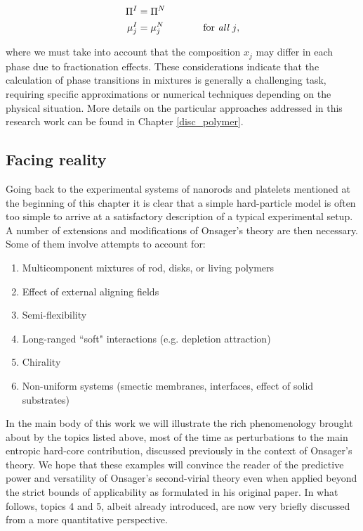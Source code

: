 \begin{align}
\Pi^{I}&=\Pi^{N} \nonumber \\
\mu^{I}_{j}&=\mu^{N}_{j} \qquad\qquad \text{for {\em all} $j$},
\end{align}

where we must take into account that the composition ${x_{j}}$ may differ in each phase due to fractionation effects. These considerations indicate that the calculation of phase transitions in mixtures is generally a challenging task, requiring specific approximations or numerical techniques depending on the physical situation. More details on the particular approaches addressed in this research work can be found in Chapter \ref{disc_polymer}.

\subsection{Facing reality}

Going back to the experimental systems of nanorods and platelets mentioned at the beginning of this chapter it is clear that a simple hard-particle model is often too simple to arrive at a satisfactory description of a typical experimental setup. A number of extensions and modifications of Onsager's theory are then necessary. Some of them involve attempts to account for:

\begin{enumerate}
\item Multicomponent mixtures of rod, disks, or living polymers
\item Effect of external aligning fields
\item Semi-flexibility
\item Long-ranged ``soft" interactions (e.g. depletion attraction)
\item Chirality
\item Non-uniform systems (smectic membranes, interfaces, effect of solid substrates)
\end{enumerate}

In the main body of this work we will illustrate the rich phenomenology brought about by the topics listed above, most of the time as perturbations to the main entropic hard-core contribution, discussed previously in the context of Onsager's theory. We hope that these examples will convince the reader of the predictive power and versatility of Onsager's second-virial theory even when applied beyond the strict bounds of applicability as formulated in his original paper. In what follows, topics 4 and 5, albeit already introduced, are now very briefly discussed from a more quantitative perspective.

